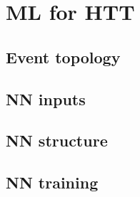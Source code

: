 \subsection*{}
\section{ML for HTT}

\subsection{Event topology}


\subsection{NN inputs}


\subsection{NN structure}


\subsection{NN training}
